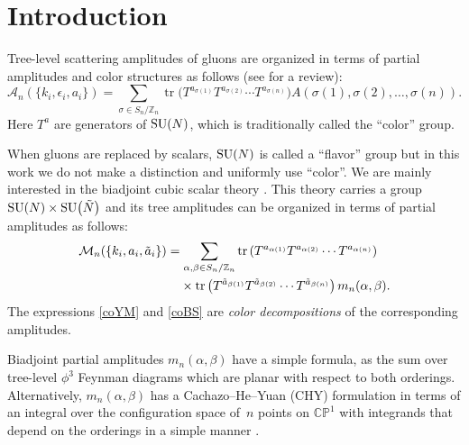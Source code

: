 \documentclass[pdftex]{sigma}
\theoremstyle{definition}
\numberwithin{equation}{section}
\begin{document}


\section{Introduction}

Tree-level scattering amplitudes of gluons are organized in terms of partial amplitudes and color structures as follows (see \cite{Mangano:1990by} for a review):
\begin{equation}\label{coYM}
 {\mathcal A}_n(\{ k_i,\epsilon_i,a_i\} ) = \sum_{\sigma \in S_{n}/{\mathbb{Z}_n}} \operatorname{tr}\big( T^{a_{\sigma (1)}}T^{a_{\sigma (2)}} \cdots T^{a_{\sigma (n)}}\big)A(\sigma(1),\sigma(2),\dots ,\sigma(n)).
\end{equation}
%
Here $T^a$ are generators of ${\rm SU}(N)$, which is traditionally called the ``color'' group.

When gluons are replaced by scalars, ${\rm SU}(N)$ is called a ``flavor'' group but in this work we do not make a distinction and uniformly use ``color''. We are mainly interested in the biadjoint cubic scalar theory \cite{Cachazo:2013iea}. This theory carries a group ${\rm SU}(N)\times {\rm SU}\big(\tilde N\big)$ and its tree amplitudes can be organized in terms of partial amplitudes as follows:
\begin{align}
& {\mathcal M}_n(\{ k_i,a_i,{\tilde a}_i\} ) = \sum_{\alpha,\beta \in S_{n}/{\mathbb{Z}_n}} \operatorname{tr}\left( T^{a_{\alpha (1)}}T^{a_{\alpha (2)}} \cdots T^{a_{\alpha (n)}}\right)\nonumber\\
 &\hphantom{{\mathcal M}_n(\{ k_i,a_i,{\tilde a}_i\} ) =}{}
 \times \operatorname{tr}\left( T^{{\tilde a}_{\beta (1)}}T^{{\tilde a}_{\beta (2)}} \cdots T^{{\tilde a}_{\beta (n)}}\right)m_n(\alpha,\beta).\label{coBS}
\end{align}
The expressions \eqref{coYM} and \eqref{coBS} are {\it color decompositions} of the corresponding amplitudes.

Biadjoint partial amplitudes $m_n(\alpha,\beta)$ have a simple formula, as the sum over tree-level $\phi^3$ Feynman diagrams which are planar with respect to both orderings. Alternatively, $m_n(\alpha,\beta)$ has a Cachazo--He--Yuan (CHY) formulation in terms of an integral over the configuration space of~$n$ points on $\mathbb{CP}^1$ with integrands that depend on the orderings in a simple manner \cite{Cachazo:2013hca,Cachazo:2013iea}.
\end{document}
